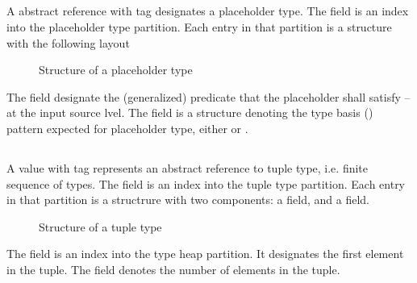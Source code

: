 \subsection{}
\label{sec:ifc:TypeSort:Placeholder}

A  abstract reference with tag 
 designates a placeholder type.
The  field is an index into the placeholder type partition.
Each entry in that partition is a structure with the following layout
%
\begin{figure}[H]
	\centering
	\caption{Structure of a placeholder type}
	\label{fig:ifc-placeholder-type-structure}
\end{figure}
%
The  field designate the (generalized) predicate that the placeholder
shall satisfy -- at the input source lvel.
The  field is a structure denoting the type basis
() pattern expected for placeholder type,
either  or .


\subsection{}
\label{sec:ifc:TypeSort:Tuple}

A  value with tag  represents
an abstract reference to tuple type, i.e. finite sequence of types.
The  field is an index into the tuple type partition.
Each entry in that partition is a structrure with two components: a  field,
and a  field.
%
\begin{figure}[H]
	\centering
	\caption{Structure of a tuple type}
	\label{fig:ifc-tuple-type-structure}
\end{figure}
%
The  field is an index into the type heap partition.  It designates the first element
in the tuple.
The  field denotes the number of elements in the tuple.


